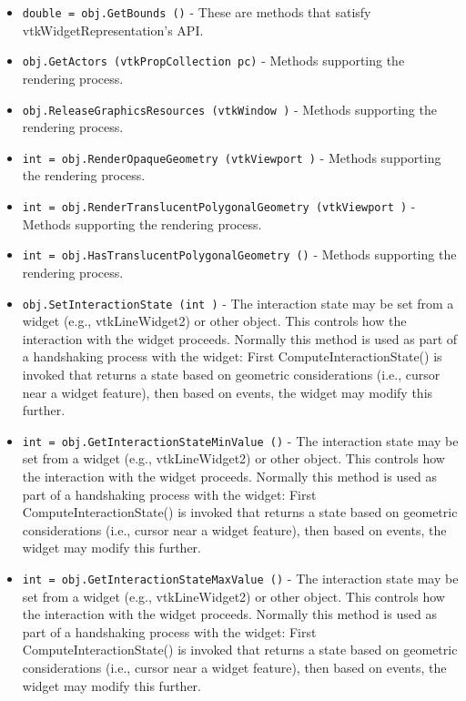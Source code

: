 \begin{itemize}
\item  \verb|double = obj.GetBounds ()| -  These are methods that satisfy vtkWidgetRepresentation's API.

\item  \verb|obj.GetActors (vtkPropCollection pc)| -  Methods supporting the rendering process.

\item  \verb|obj.ReleaseGraphicsResources (vtkWindow )| -  Methods supporting the rendering process.

\item  \verb|int = obj.RenderOpaqueGeometry (vtkViewport )| -  Methods supporting the rendering process.

\item  \verb|int = obj.RenderTranslucentPolygonalGeometry (vtkViewport )| -  Methods supporting the rendering process.

\item  \verb|int = obj.HasTranslucentPolygonalGeometry ()| -  Methods supporting the rendering process.

\item  \verb|obj.SetInteractionState (int )| -  The interaction state may be set from a widget (e.g., vtkLineWidget2) or
 other object. This controls how the interaction with the widget
 proceeds. Normally this method is used as part of a handshaking
 process with the widget: First ComputeInteractionState() is invoked that
 returns a state based on geometric considerations (i.e., cursor near a
 widget feature), then based on events, the widget may modify this
 further.

\item  \verb|int = obj.GetInteractionStateMinValue ()| -  The interaction state may be set from a widget (e.g., vtkLineWidget2) or
 other object. This controls how the interaction with the widget
 proceeds. Normally this method is used as part of a handshaking
 process with the widget: First ComputeInteractionState() is invoked that
 returns a state based on geometric considerations (i.e., cursor near a
 widget feature), then based on events, the widget may modify this
 further.

\item  \verb|int = obj.GetInteractionStateMaxValue ()| -  The interaction state may be set from a widget (e.g., vtkLineWidget2) or
 other object. This controls how the interaction with the widget
 proceeds. Normally this method is used as part of a handshaking
 process with the widget: First ComputeInteractionState() is invoked that
 returns a state based on geometric considerations (i.e., cursor near a
 widget feature), then based on events, the widget may modify this
 further.


\end{itemize}

